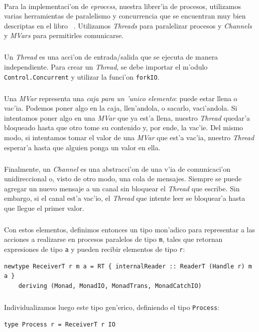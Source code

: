 \documentclass[a4paper]{article}
\begin{document}
\paragraph{}Para la implementaci'on de \textsl{eprocess}, nuestra librer'ia de procesos, utilizamos varias herramientas de paralelismo y concurrencia que se encuentran muy bien descriptas en el libro ~\cite{realworldhaskell}.  Utilizamos \textsl{Threads} para paralelizar procesos y \textsl{Channels} y \textsl{MVars} para permitirles comunicarse.
\subparagraph{}Un \textsl{Thread} es una acci'on de entrada/salida que se ejecuta de manera independiente.  Para crear un \textsl{Thread}, se debe importar el m'odulo \texttt{Control.Concurrent} y utilizar la funci'on \texttt{forkIO}.
\subparagraph{}Una \textsl{MVar} representa una \textit{caja para un 'unico elemento}: puede estar llena o vac'ia.  Podemos poner algo en la caja, llen'andola, o sacarlo, vaci'andola.  Si intentamos poner algo en una \textsl{MVar} que ya est'a llena, nuestro \textsl{Thread} quedar'a bloqueado hasta que otro tome su contenido y, por ende, la vac'ie.  Del mismo modo, si intentamos tomar el valor de una \textsl{MVar} que est'a vac'ia, nuestro \textsl{Thread} esperar'a hasta que alguien ponga un valor en ella.
\subparagraph{}Finalmente, un \textsl{Channel} es una abstracci'on de una v'ia de comunicaci'on unidireccional o, visto de otro modo, una cola de mensajes.  Siempre se puede agregar un nuevo mensaje a un canal sin bloquear el \textsl{Thread} que escribe.  Sin embargo, si el canal est'a vac'io, el \textsl{Thread} que intente leer se bloquear'a hasta que llegue el primer valor.
\subparagraph{}Con estos elementos, definimos entonces un tipo mon'adico para representar a las acciones a realizarse en procesos paralelos de tipo \texttt{m}, tales que retornan expresiones de tipo \texttt{a} y pueden recibir elementos de tipo \texttt{r}:
\begin{center}\begin{lstlisting}
newtype ReceiverT r m a = RT { internalReader :: ReaderT (Handle r) m a }
    deriving (Monad, MonadIO, MonadTrans, MonadCatchIO)
\end{lstlisting}\end{center}
\subparagraph{}Individualizamos luego este tipo gen'erico, definiendo el tipo \texttt{Process}:
\begin{center}\begin{lstlisting}
type Process r = ReceiverT r IO
\end{lstlisting}\end{center}
\end{document}
